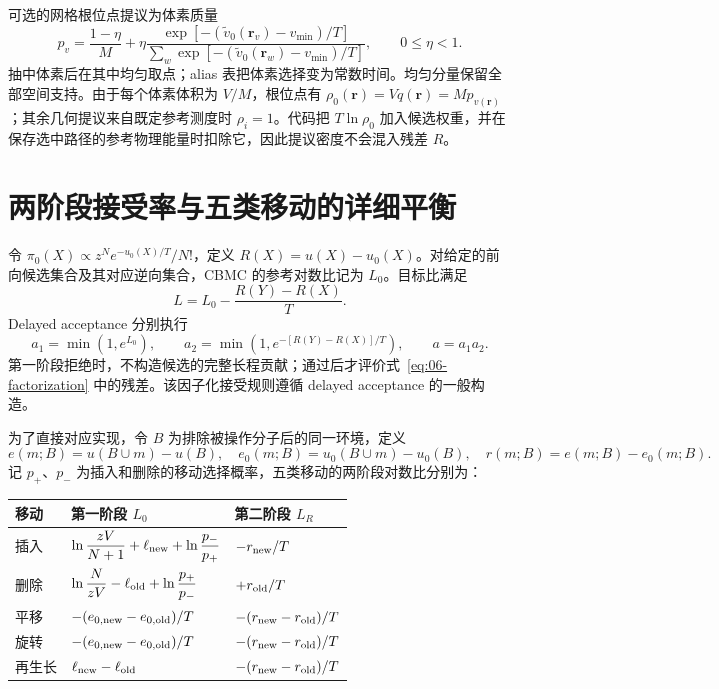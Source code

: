 可选的网格根位点提议为体素质量
\begin{equation}
p_v=\frac{1-\eta}{M}
+\eta\frac{\exp[-(\widetilde v_0(\mathbf r_v)-v_{\min})/T]}
{\sum_w\exp[-(\widetilde v_0(\mathbf r_w)-v_{\min})/T]},
\qquad 0\le\eta<1.
\label{eq:06-root-mixture}
\end{equation}
抽中体素后在其中均匀取点；alias 表把体素选择变为常数时间。均匀分量保留全部空间支持。由于每个体素体积为 $V/M$，根位点有 $\rho_0(\mathbf r)=Vq(\mathbf r)=Mp_{v(\mathbf r)}$；其余几何提议来自既定参考测度时 $\rho_i=1$。代码把 $T\ln\rho_0$ 加入候选权重，并在保存选中路径的参考物理能量时扣除它，因此提议密度不会混入残差 $R$。

\section{两阶段接受率与五类移动的详细平衡}
\label{sec:06-delayed-balance}

令 $\pi_0(X)\propto z^N e^{-u_0(X)/T}/N!$，定义 $R(X)=u(X)-u_0(X)$。对给定的前向候选集合及其对应逆向集合，CBMC 的参考对数比记为 $L_0$。目标比满足
\begin{equation}
L=L_0-\frac{R(Y)-R(X)}{T}.
\label{eq:06-factorization}
\end{equation}
Delayed acceptance 分别执行
\begin{equation}
a_1=\min(1,e^{L_0}),\qquad
a_2=\min\!\left(1,e^{-[R(Y)-R(X)]/T}\right),\qquad
a=a_1a_2.
\label{eq:06-two-stage}
\end{equation}
第一阶段拒绝时，不构造候选的完整长程贡献；通过后才评价式~\eqref{eq:06-factorization} 中的残差。该因子化接受规则遵循 delayed acceptance 的一般构造\cite{christen2005}。

为了直接对应实现，令 $B$ 为排除被操作分子后的同一环境，定义
\begin{equation}
e(m;B)=u(B\cup m)-u(B),\quad
e_0(m;B)=u_0(B\cup m)-u_0(B),\quad
r(m;B)=e(m;B)-e_0(m;B).
\label{eq:06-local-residual}
\end{equation}
记 $p_+$、$p_-$ 为插入和删除的移动选择概率，五类移动的两阶段对数比分别为：

\begin{center}\small
\begin{tabular}{@{}p{19mm}p{77mm}p{52mm}@{}}\toprule
移动 & 第一阶段 $L_0$ & 第二阶段 $L_R$\\\midrule
插入 & $\displaystyle\ln\frac{zV}{N+1}+\ell_{\rm new}+\ln\frac{p_-}{p_+}$ & $-r_{\rm new}/T$\\[7pt]
删除 & $\displaystyle\ln\frac{N}{zV}-\ell_{\rm old}+\ln\frac{p_+}{p_-}$ & $+r_{\rm old}/T$\\[7pt]
平移 & $-(e_{0,\rm new}-e_{0,\rm old})/T$ & $-(r_{\rm new}-r_{\rm old})/T$\\[4pt]
旋转 & $-(e_{0,\rm new}-e_{0,\rm old})/T$ & $-(r_{\rm new}-r_{\rm old})/T$\\[4pt]
再生长 & $\ell_{\rm new}-\ell_{\rm old}$ & $-(r_{\rm new}-r_{\rm old})/T$\\\bottomrule
\end{tabular}
\end{center}

